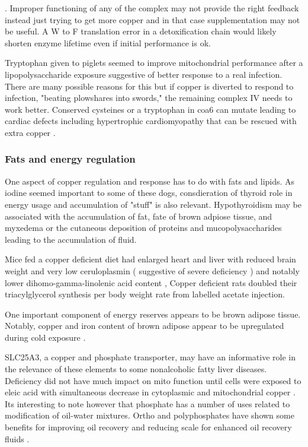 {.   
Improper functioning of any of the complex may not provide
the right feedback instead just trying to get more copper
and in that case supplementation may not be useful. 
A W to F translation error in a detoxification chain would likely
shorten enzyme lifetime even if initial performance is ok. 


Tryptophan given to piglets seemed to improve mitochondrial performance
after a lipopolysaccharide exposure 
\cite{Liu_Sun_Wang_Dietary_tryptophan_supplementation_enhances_2023}
 suggestive of better response to a real infection. There are
many possible reasons for this but if copper is diverted to
respond to infection, "beating plowshares into swords," the
remaining complex IV needs to work better.
Conserved cysteines or a tryptophan in coa6 can mutate leading to
cardiac defects including hypertrophic cardiomyopathy
that can be rescued with extra copper
\cite{PMC4049311}.  


\subsubsection{ Fats and energy regulation } 
One aspect of copper regulation and response has to do with fats
and lipids. As iodine seemed important to some of these dogs,
consdieration of thyroid role in energy usage and accumulation
of "stuff" is also relevant.  Hypothyroidism may be associated
with the accumulation of fat, fate of brown adpiose tissue,
and myxedema or the cutaneous deposition of proteins and mucopolysaccharides
leading to the accumulation of fluid.

Mice fed a copper deficient diet had enlarged heart and liver with
reduced brain weight and very low ceruloplasmin ( suggestive of
severe deficiency ) and notably lower dihomo-gamma-linolenic acid
content \cite{Cunnane_McAdoo_Prohaska_Lipid_Fatty_Acid_1986},
Copper deficient rats doubled their triacylglycerol synthesis per body
weight  rate
from labelled acetate injection\cite{AlOthman_Rosenstein_Lei_Copper_Deficiency_Increases_1993}.
 
One important component of energy reserves appears to be brown adipose
tissue. Notably, copper and iron content of brown adipose appear
to be upregulated during cold exposure \cite{Wang_Liang_Tao_Induction_copper_2017}.

SLC25A3, a copper and phosphate transporter, may have an informative
role in the relevance of these elements to some nonalcoholic fatty
liver diseases. Deficiency did not have much impact on mito function
until cells were exposed to eleic acid with simultaneous decrease in
cytoplasmic and mitochondrial copper \cite{Nakanishi_Kawasaki_Nakamura_implication_2023}.
Its interesting to note however that phosphate has a number of
uses related to modification of oil-water mixtures. 
Ortho and polyphosphates have shown some benefits for
improving oil recovery and reducing scale for enhanced oil
recovery fluids \cite{Ghosh2020}.

}
